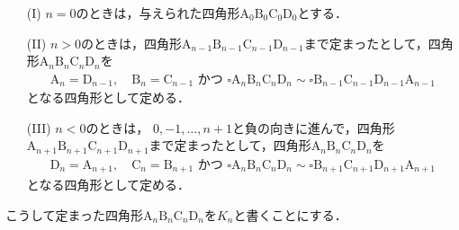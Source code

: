 \documentclass[unicode,12pt, A4j]{ltjsarticle}%
\begin{document}
\begin{itemize}
 \item[(I)] $n = 0$のときは，与えられた四角形$\text{A}_0 \text{B}_0 \text{C}_0 \text{D}_0$とする．
 \item[(II)] $n > 0$のときは，四角形$\text{A}_{n-1} \text{B}_{n-1} \text{C}_{n-1} \text{D}_{n-1}$まで定まったとして，四角形$\text{A}_n \text{B}_n \text{C}_n \text{D}_n$を
\begin{align}
\text{A}_n = \text{D}_{n-1}, \quad \text{B}_n = \text{C}_{n-1} \text{ かつ } \square\text{A}_n \text{B}_n \text{C}_n \text{D}_n \sim \square \text{B}_{n-1} \text{C}_{n-1} \text{D}_{n-1} \text{A}_{n-1}  
\end{align}
となる四角形として定める．
 \item[(III)] $n < 0$のときは， $0, -1, \dots, n+1$と負の向きに進んで，四角形$\text{A}_{n+1} \text{B}_{n+1} \text{C}_{n+1} \text{D}_{n+1}$まで定まったとして，四角形$\text{A}_n \text{B}_n \text{C}_n \text{D}_n$を
\begin{align}
 \text{D}_n = \text{A}_{n+1}, \quad \text{C}_n = \text{B}_{n+1} \text{ かつ } \square \text{A}_n \text{B}_n \text{C}_n \text{D}_n \sim \square \text{B}_{n+1} \text{C}_{n+1} \text{D}_{n+1} \text{A}_{n+1} 
\end{align}
となる四角形として定める．
\end{itemize}

こうして定まった四角形$\text{A}_n \text{B}_n \text{C}_n \text{D}_n$を$K_n$と書くことにする．
\end{document}
